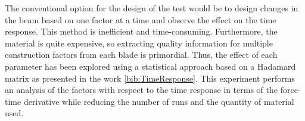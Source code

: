 The conventional option for the design of the test would be to design changes in the beam based on one factor at a time and observe the effect on the time response. This method is inefficient and time-consuming. Furthermore, the material is quite expensive, so extracting quality information for multiple construction factors from each blade is primordial. Thus, the effect of each parameter has been explored using a statistical approach based on a Hadamard matrix as presented in the work \ref{bib:TimeResponse}. This experiment performs an analysis of the factors with respect to the time response in terms of the force-time derivative while reducing the number of runs and the quantity of material used.


